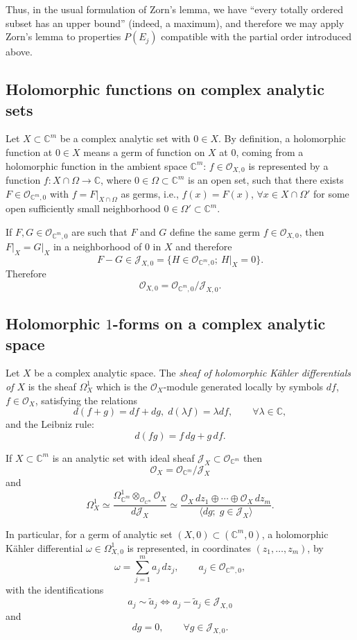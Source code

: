 \documentclass[11pt,twoside]{amsart}
\newcommand{\C}{\mathbb C}
\newcommand{\OO}{\mathcal O}
\newcommand{\J}{\mathcal J}
\theoremstyle{definition}
\begin{document}
Thus, in the usual formulation of Zorn's lemma, we have ``every totally ordered subset has an upper bound'' (indeed, a maximum), and therefore we may apply Zorn's lemma to properties $P(E_j)$ compatible with the partial order introduced above.

\subsection{Holomorphic functions on complex analytic sets}

Let $X\subset\C^m$ be a complex analytic set with $0\in X$. By definition, a holomorphic function at $0\in X$ means a germ of function on $X$ at $0$, coming from a holomorphic function in the ambient space $\C^m$: $f\in\OO_{X,0}$ is represented by a function $f\colon X\cap\Omega\to\C$,
where $0\in\Omega\subset\C^m$ is an open set, such that there exists $F\in\OO_{\C^m,0}$ with
$f=F|_{X\cap\Omega}$ as germs, i.e.,
$f(x)=F(x)$, $\forall x\in X\cap\Omega'$ for some open sufficiently small neighborhood $0\in\Omega'\subset\C^m$.

If $F,G\in\OO_{\C^m,0}$ are such that $F$ and $G$ define the same germ $f\in\OO_{X,0}$, then $F\big|_X=G\big|_X$ in a neighborhood of $0$ in $X$ and therefore
\[
F-G\in\J_{X,0}=\{H\in\OO_{\C^m,0};\ H|_X=0\}.
\]
Therefore
\[
\OO_{X,0}=\OO_{\C^m,0}/\J_{X,0}.
\]

\subsection{Holomorphic \texorpdfstring{$1$-forms}{1-forms} on a complex analytic space}

Let $X$ be a complex analytic space. The \textit{sheaf of holomorphic K\"ahler differentials of $X$} is the sheaf $\Omega_X^1$ which is the $\OO_X$-module generated locally by symbols $df$, $f\in\OO_X$, satisfying the relations
\[
d(f+g)=df+dg,\;d(\lambda f)=\lambda df,\qquad \forall\lambda\in\C,
\]
and the Leibniz rule:
\[
d(fg)=f\,dg+g\,df.
\]

If $X\subset\C^m$ is an analytic set with ideal sheaf $\J_X\subset\OO_{\C^m}$ then
\[
\OO_X=\OO_{\C^m}/\J_X
\]
and
\[
\Omega_X^1\simeq
\frac{\Omega_{\C^m}^1\otimes_{\OO_{\C^m}}\OO_X}{d\J_X}
\simeq
\frac{\OO_X\,dz_1\oplus\cdots\oplus\OO_X\,dz_m}{\langle dg;\;g\in\J_X\rangle}.
\]

In particular, for a germ of analytic set
$(X,0)\subset(\C^m,0)$,
a holomorphic Kähler differential $\omega\in\Omega_{X,0}^1$ is represented, in coordinates $(z_1,\ldots,z_m)$, by
\[
\omega=\sum_{j=1}^{m}a_j\,dz_j,
\qquad a_j\in\OO_{\C^m,0},
\]
with the identifications
\[
a_j\sim \widetilde a_j \Longleftrightarrow a_j-\widetilde a_j\in\J_{X,0}
\]
and
\[
dg=0,
\qquad \forall g\in\J_{X,0}.
\]
\end{document}
